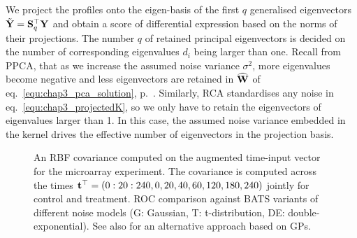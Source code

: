 
    We project the profiles onto the eigen-basis of the first $q$ generalised eigenvectors $\tilde{\mathbf{Y}} = \mathbf{S}_q^\top\mathbf{Y}$ and obtain a score of differential expression based on the norms of their projections. The number $q$ of retained principal eigenvectors is decided on the number of corresponding eigenvalues $d_i$ being larger than one.
    Recall from PPCA, that as we increase the assumed noise variance $\sigma^2$, more eigenvalues become negative and less eigenvectors are retained in $\widehat{\mathbf{W}}$ of eq.~\eqref{equ:chap3_pca_solution}, p.~\pageref{equ:chap3_pca_solution}. Similarly, RCA standardises any noise in eq.~\eqref{equ:chap3_projectedK}, so we only have to retain the eigenvectors of eigenvalues larger than 1. In this case, the assumed noise variance embedded in the kernel drives the effective number of eigenvectors in the projection basis.
 
    \begin{figure}[!htbp]
      \centering
      \caption[RBF covariance computed on the augmented time-input vector.]{
         An RBF covariance computed on the augmented time-input vector for the microarray experiment. The covariance is computed across the times $\mathbf{t}^\top = ({0:20:240}, 0, 20, 40, 60, 120, 180, 240)$ jointly for control and treatment. %
         ROC comparison against BATS variants of different noise models (G: Gaussian, T: t-distribution, DE: double-exponential). See also \citep{Kalaitzis:simple11} for an alternative approach based on GPs.
      }
    \end{figure}

